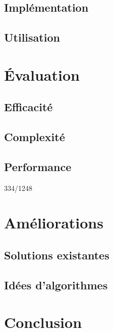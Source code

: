 \documentclass[10pt]{article}
\begin{document}
\subsection{Implémentation}

\subsection{Utilisation}

\section{Évaluation}

\subsection{Efficacité}

\subsection{Complexité}

\subsection{Performance}
334/1248

\section{Améliorations}

\subsection{Solutions existantes}

\subsection{Idées d'algorithmes}



\section*{Conclusion}
\end{document}
